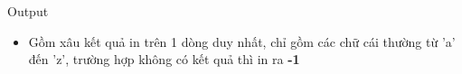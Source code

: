 Output
\begin{itemize}
	\item     Gồm xâu kết quả in trên 1 dòng duy nhất, chỉ gồm các chữ cái thường từ 'a' đến 'z', trường hợp không có kết quả thì in ra    \textbf{     -1    }
\end{itemize}